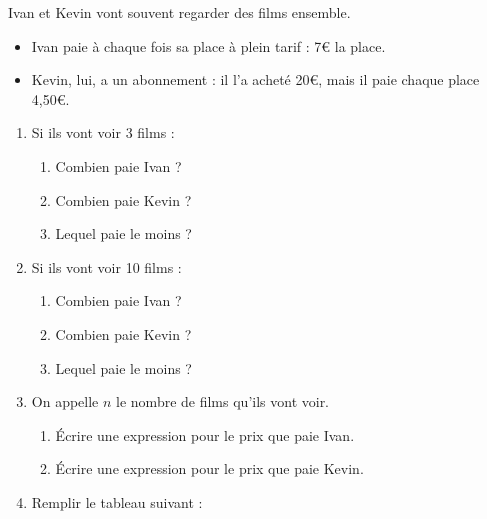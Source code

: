 \documentclass[a4paper,12pt]{article}
\begin{document}
\maketitle

\begin{enonce}
	Ivan et Kevin vont souvent regarder des films ensemble.

	\begin{itemize}
		\item Ivan paie à chaque fois sa place à plein tarif : 7€ la place.
		\item Kevin, lui, a un abonnement : il l'a acheté 20€, mais il paie chaque place 4,50€.
	\end{itemize}
\end{enonce}

\begin{enumerate}
	\item Si ils vont voir 3 films :
	      \begin{enumerate}
		      \item Combien paie Ivan ? \dotfill %
		      \item Combien paie Kevin ? \dotfill %
		      \item Lequel paie le moins ? \dotfill %
	      \end{enumerate}
	\item Si ils vont voir 10 films :
	      \begin{enumerate}
		      \item Combien paie Ivan ? \dotfill %
		      \item Combien paie Kevin ? \dotfill %
		      \item Lequel paie le moins ? \dotfill %
	      \end{enumerate}
	\item On appelle $n$ le nombre de films qu'ils vont voir.
	      \begin{enumerate}
		      \item Écrire une expression pour le prix que paie Ivan. \dotfill
		      \item Écrire une expression pour le prix que paie Kevin. \dotfill
	      \end{enumerate}
	\item Remplir le tableau suivant :


\end{enumerate}
\end{document}
